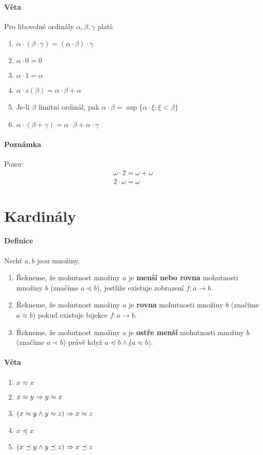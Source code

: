 \documentclass[a4paper,12pt,titlepage]{article}
\begin{document}
\paragraph{Věta}
Pro libovolné ordinály $\alpha, \beta, \gamma$ platí:
\begin{enumerate}
	\item $\alpha\cdot(\beta\cdot \gamma) = (\alpha\cdot\beta)\cdot\gamma$
	\item $\alpha \cdot 0 = 0$
	\item $\alpha \cdot 1 = \alpha$
	\item $\alpha\cdot s(\beta) = \alpha\cdot\beta + \alpha$
	\item Je-li $\beta$ limitní ordinál, pak $\alpha\cdot\beta = \sup\{\alpha\cdot
\xi : \xi < \beta \}$
\item $\alpha\cdot(\beta+\gamma) = \alpha\cdot\beta + \alpha\cdot\gamma$
\end{enumerate}
\paragraph{Poznámka}
Pozor: \begin{align}
\omega\cdot 2 = \omega + \omega \\
2\cdot\omega = \omega
\end{align}


\section{Kardinály}
\setcounter{equation}{0}
\paragraph{Definice}
Nechť $a,b$ jsou množiny. 
\begin{enumerate}
	\item Řekneme, že mohutnost množiny $a$ je \textbf{menší nebo rovna} mohutnosti množiny
	$b$ (značíme $a \preceq b$), jestliže existuje zobrazení $f: a \to b$.
	\item Řekneme, že mohutnost množiny $a$ je \textbf{rovna} mohutnosti množiny
	$b$ (značíme $a \approx b$) pokud existuje bijekce $f:a\to b$.
	\item Řekneme, že mohutnost množiny a je \textbf{ostře menší} mohutnosti množiny $b$
	(značíme $a \prec b$)
	právě když $a \preceq b \land \not(a \approx b)$.
\end{enumerate}
\paragraph{Věta}
\begin{enumerate}
	\item $x \approx x$
	\item $x \approx y \Rightarrow y \approx x$
	\item $(x \approx y \land y \approx z) \Rightarrow x \approx z$
	\item $x \preceq x$
	\item $(x \preceq y \land y \preceq z) \Rightarrow x \preceq z$
\end{enumerate}
\end{document}
